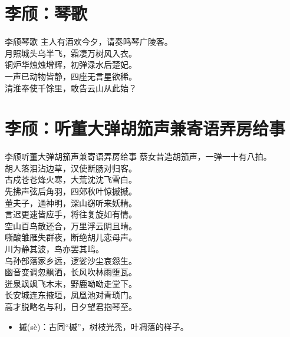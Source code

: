 \documentclass[12pt,oneside,a5paper]{book}
\begin{document}
\chapter{李颀：琴歌}
\begin{poemzh}{李颀}{琴歌}
主人有酒欢今夕，请奏鸣琴广陵客。\\
月照城头乌半飞，霜凄万树风入衣。\\
铜炉华烛烛增辉，初弹渌水后楚妃。\\
一声已动物皆静，四座无言星欲稀。\\
清淮奉使千馀里，敢告云山从此始？\\ 
\end{poemzh}

\chapter{李颀：听董大弹胡笳声兼寄语弄房给事}
\begin{poemzh}{李颀}{听董大弹胡笳声兼寄语弄房给事}
蔡女昔造胡笳声，一弹一十有八拍。\\
胡人落泪沾边草，汉使断肠对归客。\\
古戍苍苍烽火寒，大荒沈沈飞雪白。\\
先拂声弦后角羽，四郊秋叶惊摵摵。\\
董夫子，通神明，深山窃听来妖精。\\
言迟更速皆应手，将往复旋如有情。\\
空山百鸟散还合，万里浮云阴且晴。\\
嘶酸雏雁失群夜，断绝胡儿恋母声。\\
川为静其波，鸟亦罢其鸣。\\
乌孙部落家乡远，逻娑沙尘哀怨生。\\
幽音变调忽飘洒，长风吹林雨堕瓦。\\
迸泉飒飒飞木末，野鹿呦呦走堂下。\\
长安城连东掖垣，凤凰池对青琐门。\\
高才脱略名与利，日夕望君抱琴至。\\ 
\end{poemzh}

\begin{itemize}
\item 摵(sè)：古同“槭”，树枝光秃，叶凋落的样子。
\end{itemize}
\end{document}
